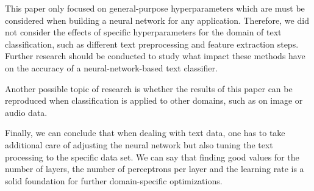 \documentclass[sigconf]{acmart}
\begin{document}
This paper only focused on general-purpose hyperparameters which are must be considered when building a neural network for any application. Therefore, we did not consider the effects of specific hyperparameters for the domain of text classification, such as different text preprocessing and feature extraction steps. Further research should be conducted to study what impact these methods have on the accuracy of a neural-network-based text classifier.

Another possible topic of research is whether the results of this paper can be reproduced when classification is applied to other domains, such as on image or audio data.

Finally, we can conclude that when dealing with text data, one has to take additional care of adjusting the neural network but also tuning the text processing to the specific data set. We can say that finding good values for the number of layers, the number of perceptrons per layer and the learning rate is a solid foundation for further domain-specific optimizations.



\end{document}
